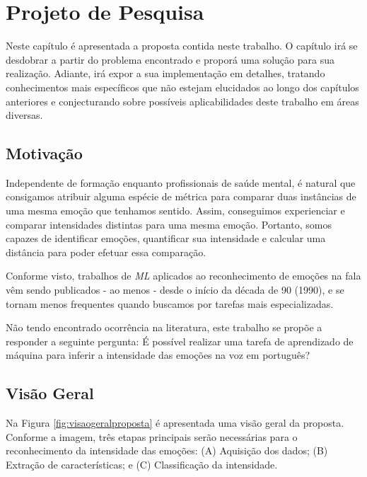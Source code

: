 \chapter{Projeto de Pesquisa}\label{Cap:Projeto de Pesquisa}

Neste capítulo é apresentada a proposta contida neste trabalho. O capítulo irá se desdobrar a partir do problema encontrado e proporá uma solução para sua realização. Adiante, irá expor a sua implementação em detalhes, tratando conhecimentos mais específicos que não estejam elucidados ao longo dos capítulos anteriores e conjecturando sobre possíveis aplicabilidades deste trabalho em áreas diversas.

\section{Motivação}

Independente de formação enquanto profissionais de saúde mental, é natural que consigamos atribuir alguma espécie de métrica para comparar duas instâncias de uma mesma emoção que tenhamos sentido. Assim, conseguimos experienciar e comparar intensidades distintas para uma mesma emoção. Portanto, somos capazes de identificar emoções, quantificar sua intensidade e calcular uma distância para poder efetuar essa comparação.

Conforme visto, trabalhos de \textit{ML} aplicados ao reconhecimento de emoções na fala vêm sendo publicados - ao menos - desde o início da década de 90 (1990), e se tornam menos frequentes quando buscamos por tarefas mais especializadas.

Não tendo encontrado ocorrência na literatura, este trabalho se propõe a responder a seguinte pergunta: É possível realizar uma tarefa de aprendizado de máquina para inferir a intensidade das emoções na voz em português?

\section{Visão Geral}

Na Figura \ref{fig:visaogeralproposta} é apresentada uma visão geral da proposta. Conforme a imagem, três etapas principais serão necessárias para o reconhecimento da intensidade das emoções: (A) Aquisição dos dados; (B) Extração de características; e (C) Classificação da intensidade.

